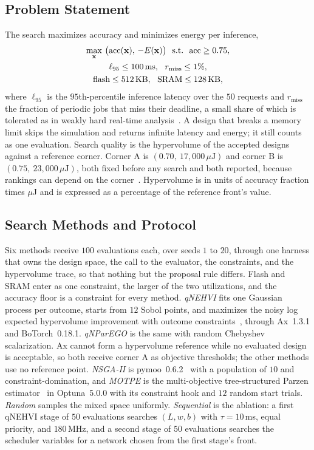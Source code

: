 \subsection{Problem Statement}
\label{sec:problem}
The search maximizes accuracy and minimizes energy per inference,
\begin{gather}
\max_{\mathbf{x}}\ \bigl(\mathrm{acc}(\mathbf{x}),\,-E(\mathbf{x})\bigr)
\ \ \text{s.t.}\ \ \mathrm{acc}\geq 0.75,\notag\\
\ell_{95}\leq 100\,\text{ms},\ \ r_{\mathrm{miss}}\leq 1\%,\notag\\
\text{flash}\leq 512\,\text{KB},\ \ \text{SRAM}\leq 128\,\text{KB},
\label{eq:problem}
\end{gather}
where $\ell_{95}$ is the $95$th-percentile inference latency over the $50$
requests and $r_{\mathrm{miss}}$ the fraction of periodic jobs that miss their
deadline, a small share of which is tolerated as in weakly hard real-time
analysis~\cite{pazzaglia2021weakly}. A design that breaks a memory limit skips the simulation and
returns infinite latency and energy; it still counts as one evaluation. Search
quality is the hypervolume of the accepted designs against a reference corner.
Corner A is $(0.70,\ 17{,}000\,\mu\mathrm{J})$ and corner B is
$(0.75,\ 23{,}000\,\mu\mathrm{J})$, both fixed before any search and both
reported, because rankings can depend on the corner~\cite{pang2024reference}.
Hypervolume is in units of accuracy fraction times $\mu$J and is expressed as
a percentage of the reference front's value.

\subsection{Search Methods and Protocol}
\label{sec:methods}
Six methods receive $100$ evaluations each, over seeds $1$ to $20$, through
one harness that owns the design space, the call to the evaluator, the
constraints, and the hypervolume trace, so that nothing but the proposal rule
differs. Flash and SRAM enter as one constraint, the larger of the two
utilizations, and the accuracy floor is a constraint for every method.
\emph{qNEHVI} fits one Gaussian process per outcome, starts from $12$
Sobol points, and maximizes the noisy log expected hypervolume improvement
with outcome constraints~\cite{low2024constrained,mamun2025mobo}, through
Ax~1.3.1 and BoTorch~0.18.1. \emph{qNParEGO} is the same with random
Chebyshev scalarization. Ax cannot form a hypervolume reference while no
evaluated design is acceptable, so both receive corner A as objective
thresholds; the other methods use no reference point. \emph{NSGA-II} is
pymoo~0.6.2~\cite{blank2020pymoo} with a population of $10$ and
constraint-domination, and \emph{MOTPE} is the multi-objective
tree-structured Parzen estimator~\cite{ozaki2022motpe} in Optuna~5.0.0 with its
constraint hook and $12$ random start trials. \emph{Random} samples the mixed
space uniformly. \emph{Sequential} is the ablation: a first qNEHVI stage of
$50$ evaluations searches $(L,w,b)$ with $\tau=10$\,ms, equal priority, and
$180$\,MHz, and a second stage of $50$ evaluations searches the scheduler
variables for a network chosen from the first stage's front.

